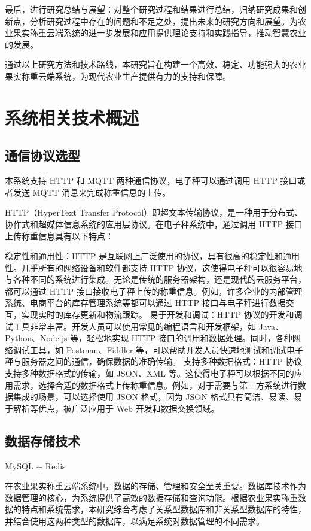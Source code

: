 \documentclass{xduugthesis}
\begin{document}
最后，进行研究总结与展望：对整个研究过程和结果进行总结，归纳研究成果和创新点，分析研究过程中存在的问题和不足之处，提出未来的研究方向和展望。为农业果实称重云端系统的进一步发展和应用提供理论支持和实践指导，推动智慧农业的发展。

通过以上研究方法和技术路线，本研究旨在构建一个高效、稳定、功能强大的农业果实称重云端系统，为现代农业生产提供有力的支持和保障。

\chapter{系统相关技术概述}

\section{通信协议选型}

本系统支持 HTTP 和 MQTT 两种通信协议，电子秤可以通过调用 HTTP 接口或者发送 MQTT 消息来完成称重信息的上传。

HTTP（HyperText Transfer Protocol）即超文本传输协议，是一种用于分布式、协作式和超媒体信息系统的应用层协议。在电子秤系统中，通过调用 HTTP 接口上传称重信息具有以下特点：

稳定性和通用性：HTTP 是互联网上广泛使用的协议，具有很高的稳定性和通用性。几乎所有的网络设备和软件都支持 HTTP 协议，这使得电子秤可以很容易地与各种不同的系统进行集成。无论是传统的服务器架构，还是现代的云服务平台，都可以通过 HTTP 接口接收电子秤上传的称重信息。例如，许多企业的内部管理系统、电商平台的库存管理系统等都可以通过 HTTP 接口与电子秤进行数据交互，实现实时的库存更新和物流跟踪\cite{Zhao2016}。
易于开发和调试：HTTP 协议的开发和调试工具非常丰富。开发人员可以使用常见的编程语言和开发框架，如 Java、Python、Node.js 等，轻松地实现 HTTP 接口的调用和数据处理。同时，各种网络调试工具，如 Postman、Fiddler 等，可以帮助开发人员快速地测试和调试电子秤与服务器之间的通信，确保数据的准确传输。
支持多种数据格式：HTTP 协议支持多种数据格式的传输，如 JSON、XML 等。这使得电子秤可以根据不同的应用需求，选择合适的数据格式上传称重信息。例如，对于需要与第三方系统进行数据集成的场景，可以选择使用 JSON 格式，因为 JSON 格式具有简洁、易读、易于解析等优点，被广泛应用于 Web 开发和数据交换领域。

\section{数据存储技术}

MySQL + Redis

在农业果实称重云端系统中，数据的存储、管理和安全至关重要。数据库技术作为数据管理的核心，为系统提供了高效的数据存储和查询功能。根据农业果实称重数据的特点和系统需求，本研究综合考虑了关系型数据库和非关系型数据库的特性，并结合使用这两种类型的数据库，以满足系统对数据管理的不同需求。
\end{document}
